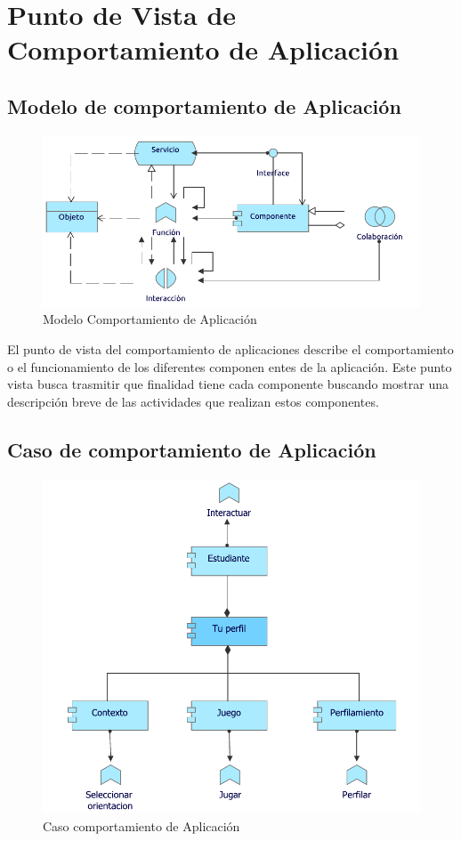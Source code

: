 \section{Punto de Vista de Comportamiento de Aplicación}

\subsection{Modelo de comportamiento de Aplicación}
\begin{figure}[h!]
	\centering
	\includegraphics[width=.8\linewidth]{imgs/modelo/CmtoAplicacion}
	\caption{Modelo Comportamiento de Aplicación}
\end{figure}

El punto de vista del comportamiento de aplicaciones describe el comportamiento o el funcionamiento de los diferentes componen entes de la aplicación. Este punto vista busca trasmitir que finalidad tiene cada componente buscando mostrar una descripción breve de las actividades que realizan estos componentes.

\newpage

\subsection{Caso  de comportamiento de Aplicación}
\begin{figure}[h!]
	\centering
	\includegraphics[width=.8\linewidth]{imgs/caso/aplicacion/comportamiento_aplicacion}
	\caption{Caso comportamiento de Aplicación}
\end{figure}


